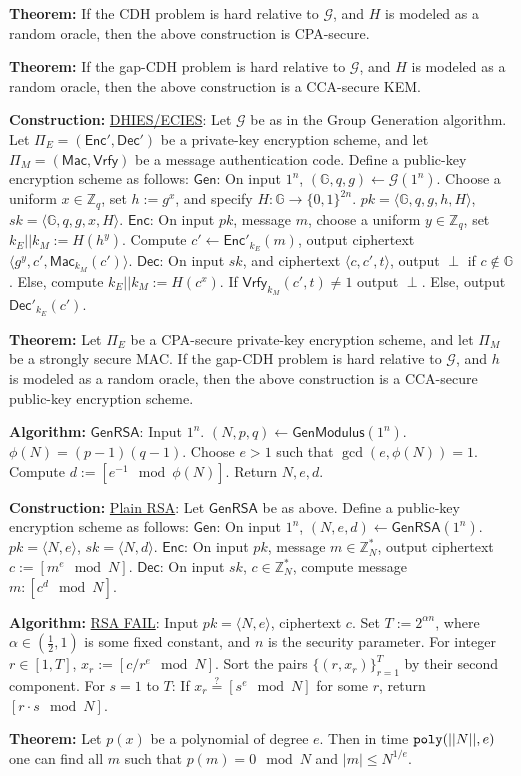 \documentclass[10pt]{article}
\newcommand{\Z}{\mathbb{Z}}
\newcommand{\G}{\mathbb{G}}
\newcommand{\GGG}{\mathcal{G}}
\newcommand{\thm}[1]{{\bf Theorem:} \underline{#1}}
\newcommand{\con}[1]{{\bf Construction:} \underline{#1}}
\newcommand{\alg}[1]{{\bf Algorithm:} \underline{#1}}
\newcommand{\Enc}{\mathsf{Enc}}
\newcommand{\Dec}{\mathsf{Dec}}
\newcommand{\Mac}{\mathsf{Mac}}
\newcommand{\Vrfy}{\mathsf{Vrfy}}
\newcommand{\Gen}{\mathsf{Gen}}
\newcommand{\GenM}{\mathsf{GenModulus}}
\newcommand{\GenRSA}{\mathsf{GenRSA}}
\newcommand{\ang}[1]{\langle#1\rangle}
\newcommand{\poly}{{\tt poly}}
\newcommand{\from}{\leftarrow}
\begin{document}
\begin{multicols}{4}
\thm{}If the CDH problem is hard relative to $\GGG$, and $H$ is modeled as a random oracle, then the above construction is CPA-secure.

\thm{}If the gap-CDH problem is hard relative to $\GGG$, and $H$ is modeled as a random oracle, then the above construction is a CCA-secure KEM.

\con{DHIES/ECIES}: Let $\GGG$ be as in the Group Generation algorithm. Let $\Pi_E=(\Enc',\Dec')$ be a private-key encryption scheme, and let $\Pi_M=(\Mac,\Vrfy)$ be a message authentication code. Define a public-key encryption scheme as follows: $\Gen$: On input $1^n$, $(\G,q,g)\from\GGG(1^n)$. Choose a uniform $x\in\Z_q$, set $h:=g^x$, and specify $H:\G\to\{0,1\}^{2n}$. $pk=\ang{\G,q,g,h,H}$, $sk=\ang{\G,q,g,x,H}$. $\Enc$: On input $pk$, message $m$, choose a uniform $y\in\Z_q$, set $k_E||k_M:=H(h^y)$. Compute $c'\from\Enc'_{k_E}(m)$, output ciphertext $\ang{g^y,c',\Mac_{k_M}(c')}$. $\Dec$: On input $sk$, and ciphertext $\ang{c,c',t}$, output $\perp$ if $c\not\in\G$. Else, compute $k_E||k_M:=H(c^x)$. If $\Vrfy_{k_M}(c',t)\neq1$ output $\perp$. Else, output $\Dec'_{k_E}(c')$.

\thm{}Let $\Pi_E$ be a CPA-secure private-key encryption scheme, and let $\Pi_M$ be a strongly secure MAC. If the gap-CDH problem is hard relative to $\GGG$, and $h$ is modeled as a random oracle, then the above construction is a CCA-secure public-key encryption scheme.

\alg{$\GenRSA$}: Input $1^n$. $(N,p,q)\from\GenM(1^n)$. $\phi(N)=(p-1)(q-1)$. Choose $e>1$ such that $\gcd(e,\phi(N))=1$. Compute $d:=[e^{-1}\mod{\phi(N)}]$. Return $N,e,d$.

\con{Plain RSA}: Let $\GenRSA$ be as above. Define a public-key encryption scheme as follows: $\Gen$: On input $1^n$, $(N,e,d)\from\GenRSA(1^n)$. $pk=\ang{N,e}$, $sk=\ang{N,d}$. $\Enc$: On input $pk$, message $m\in\Z_N^*$, output ciphertext $c:=[m^e\mod{N}]$. $\Dec$: On input $sk$, $c\in\Z_N^*$, compute message $m:[c^d\mod{N}]$.

\alg{RSA FAIL}: Input $pk=\ang{N,e}$, ciphertext $c$. Set $T:=2^{\alpha n}$, where $\alpha\in(\frac{1}{2},1)$ is some fixed constant, and $n$ is the security parameter. For integer $r\in[1,T]$, $x_r:=[c/r^e\mod{N}]$. Sort the pairs $\{(r,x_r)\}^T_{r=1}$ by their second component. For $s=1$ to $T$: If $x_r\overset{?}{=}[s^e\mod{N}]$ for some $r$, return $[r\cdot s\mod{N}]$.

\thm{}Let $p(x)$ be a polynomial of degree $e$. Then in time $\poly(||N||,e)$ one can find all $m$ such that $p(m)=0\mod{N}$ and $|m|\leq N^{1/e}$.


\end{multicols}
\end{document}

